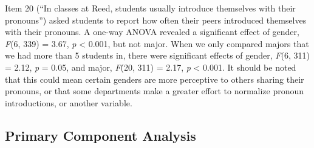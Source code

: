 \documentclass[12pt,twoside]{reedthesis}
\begin{document}
Item 20 (``In classes at Reed, students usually introduce themselves with their pronouns'') asked students to report how often their peers introduced themselves with their pronouns. A one-way ANOVA revealed a significant effect of gender, \emph{F}(6, 339) = 3.67, \emph{p} \textless{} 0.001, but not major. When we only compared majors that we had more than 5 students in, there were significant effects of gender, \emph{F}(6, 311) = 2.12, \emph{p} = 0.05, and major, \emph{F}(20, 311) = 2.17, \emph{p} \textless{} 0.001. It should be noted that this could mean certain genders are more perceptive to others sharing their pronouns, or that some departments make a greater effort to normalize pronoun introductions, or another variable.

\hypertarget{primary-component-analysis}{%
\subsection{Primary Component Analysis}\label{primary-component-analysis}}
\end{document}
